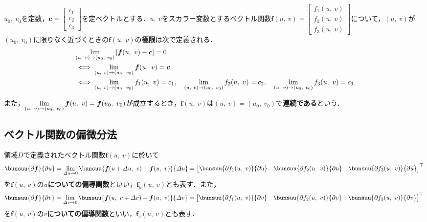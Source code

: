 $u_0,\ v_0$を定数，$\bm{c} = 
\begin{bmatrix}
	c_1\\ c_2\\ c_3
\end{bmatrix}
$を定ベクトルとする．$u,\ v$をスカラー変数とするベクトル関数$\bm{f}(u,\ v) = 
\begin{bmatrix}
	f_1(u,\ v)\\ f_2(u,\ v)\\ f_3(u,\ v)
\end{bmatrix}
$について，$(u,\ v)$が$(u_0,\ v_0)$に限りなく近づくときの$\bm{f}(u,\ v)$の\textbf{極限}は次で定義される．
\begin{align}
	&\lim_{(u,\ v) \to (u_0,\ v_0)} |\bm{f}(u,\ v) - \bm{c}| = 0 \notag\\
	&\iff \lim_{(u,\ v) \to (u_0,\ v_0)} \bm{f}(u,\ v) = \bm{c}\\
	&\iff \lim_{(u,\ v) \to (u_0,\ v_0)} f_1(u,\ v) = c_1,\quad \lim_{(u,\ v) \to (u_0,\ v_0)} f_2(u,\ v) = c_2,\quad \lim_{(u,\ v) \to (u_0,\ v_0)} f_3(u,\ v) = c_3
\end{align}

また，$\dlim_{(u,\ v) \to (u_0,\ v_0)} \bm{f}(u,\ v) = \bm{f}(u_0,\ v_0)$が成立するとき，$\bm{f}(u,\ v)$は$(u,\ v) = (u_0,\ v_0)$で\textbf{連続である}という．



\subsection{ベクトル関数の偏微分法}

領域$D$で定義されたベクトル関数$\bm{f}(u,\ v)$に於いて
\begin{equation}
	\bunsuu{\partial \bm{f}}{\partial u} = \lim_{\varDelta u \to 0} \bunsuu{\bm{f}(u + \varDelta u,\ v) - \bm{f}(u,\ v)}{\varDelta u} =
	{
	\begin{bmatrix}
		\bunsuu{\partial f_1(u,\ v)}{\partial u} &
		\bunsuu{\partial f_2(u,\ v)}{\partial u} &
		\bunsuu{\partial f_3(u,\ v)}{\partial u}
	\end{bmatrix}
	}^\top
\end{equation}
を$\bm{f}(u,\ v)$の\textbf{$u$についての偏導関数}といい，$\bm{f}_u(u,\ v)$とも表す．また，
\begin{equation}
	\bunsuu{\partial \bm{f}}{\partial v} = \lim_{\varDelta v \to 0} \bunsuu{\bm{f}(u,\ v + \varDelta v) - \bm{f}(u,\ v)}{\varDelta v} =
	{
	\begin{bmatrix}
		\bunsuu{\partial f_1(u,\ v)}{\partial v} &
		\bunsuu{\partial f_2(u,\ v)}{\partial v} &
		\bunsuu{\partial f_3(u,\ v)}{\partial v}
	\end{bmatrix}
	}^\top
\end{equation}
を$\bm{f}(u,\ v)$の\textbf{$v$についての偏導関数}といい，$\bm{f}_v(u,\ v)$とも表す．

